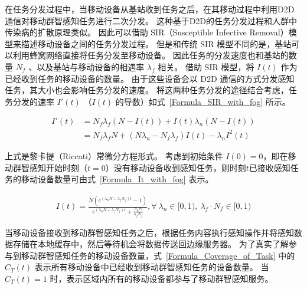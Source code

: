 在任务分发过程中，当移动设备从基站收到任务之后，在其移动过程中利用D2D通信对移动群智感知任务进行二次分发。
这种基于D2D的任务分发过程和人群中传染病的扩散原理类似。
因此可以借助 SIR（Susceptible Infective Removal）模型来描述移动设备之间的任务分发过程。
但是和传统 SIR 模型不同的是，基站可以利用蜂窝网络直接将任务分发至移动设备。
因此任务的分发速度也和基站的数量 $N_f$ 、以及基站与移动设备的相遇率 $\lambda_f$ 相关。
借助 SIR 模型，将 $I(t)$ 作为已经收到任务的移动设备的数量。
由于这些设备会以 D2D 通信的方式分发感知任务，其大小也会影响任务分发的速度。
将这两种任务分发的途径结合考虑，任务分发的速率 $I'(t)$ （$I(t)$ 的导数）如式~\eqref{Formula_SIR_with_fog} 所示。

\begin{equation}
  \label{Formula_SIR_with_fog}
  \begin{aligned}
    I'(t) &= N_f \lambda_f (N-I(t)) + I(t) \lambda_n (N-I(t)) \\
    &= N_f \lambda_f N + ( N \lambda_n - N_f \lambda_f) I(t) - \lambda_n I^2(t) 
  \end{aligned}
\end{equation}

上式是黎卡提（Riccati）常微分方程形式。
考虑到初始条件 $I(0)=0$，即在移动群智感知开始时刻（$t=0$）没有移动设备收到感知任务，则时刻$t$已接收感知任务的移动设备数量可由式~\eqref{Formula_It_with_fog} 表示。

\begin{equation}
\label{Formula_It_with_fog}
\begin{aligned}
I(t) = \frac{N (e^{(\lambda_n N + \lambda_f N_f) t} - 1)}{e^{(\lambda_n N + \lambda_f N_f) t} + \frac{\lambda_n N}{\lambda_f N_f}}, \forall\ \lambda_n \in [0, 1),\ \lambda_f \cdot N_f \in [0, 1)
\end{aligned}
\end{equation}


当移动设备接收到移动群智感知任务之后，根据任务内容执行感知操作并将感知数据存储在本地缓存中，然后等待机会将数据传送回边缘服务器。
为了真实了解参与到移动群智感知任务的移动设备数量，式~\eqref{Formula_Coverage_of_Task} 中的 $C_T(t)$ 表示所有移动设备中已经收到移动群智感知任务的设备数量。
当 $C_T(t)=1$ 时，表示区域内所有的移动设备都参与了移动群智感知服务。

